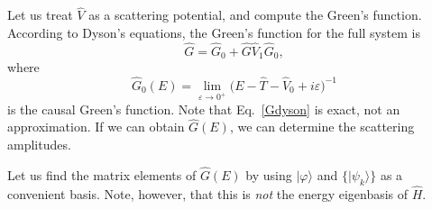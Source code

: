 \documentclass[prx,12pt]{revtex4-2}
\begin{document}
Let us treat $\hat{V}$ as a scattering potential, and compute the
Green's function.  According to Dyson's equations, the Green's
function for the full system is
\begin{equation}
  \hat{G} = \hat{G}_0 + \hat{G} \hat{V}_1 \hat{G}_0,
  \label{Gdyson}
\end{equation}
where
\begin{equation}
  \hat{G}_0(E) = \lim_{\varepsilon\rightarrow0^+}
  \Big(E - \hat{T} - \hat{V}_0 + i\varepsilon\Big)^{-1}
\end{equation}
is the causal Green's function.  Note that Eq.~\eqref{Gdyson} is
exact, not an approximation.  If we can obtain $\hat{G}(E)$, we can
determine the scattering amplitudes.

Let us find the matrix elements of $\hat{G}(E)$ by using
$|\varphi\rangle$ and $\{|\psi_k\rangle\}$ as a convenient basis.
Note, however, that this is \textit{not} the energy eigenbasis of
$\hat{H}$.
\end{document}
